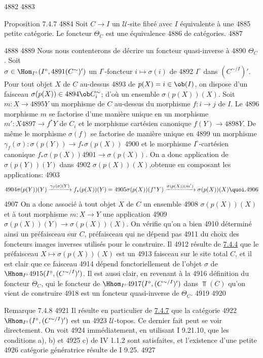   4882	
  4883	\begin{enonce*}{Proposition 7.4.7}
  4884	Soit $C \to I$ un $\mathcal{U}$-site fibré avec $I$ équivalente à une
  4885	petite catégorie. Le foncteur $\Theta_C$  est une équivalence
  4886	de catégories.
  4887	\end{enonce*}
  4888	
  4889	Nous nous contenterons de décrire un foncteur quasi-inverse à
  4890	$\Theta_C$. Soit \\ $\sigma \in \Hom_{I^{\circ}} (I^{\circ},
  4891	(C^{\sim})')$ \ie un $I^{\circ}$-foncteur $i \mapsto \sigma(i)$ de
  4892	$I^{\circ}$ dans $(C^{\sim/I})'$. Pour tout objet $X$ de $C$ au-dessus
  4893	de $p(X) = i \in \ob (I)$, on dispose d'un faisceau $\sigma(p(X)) \in
  4894	\ob C^{\sim}_i$; d'où un ensemble $\sigma (p(X)) (X)$. Soit $m : X \to
  4895	Y$ un morphisme de $C$ au-dessus du morphisme $f : i \to j$ de $I$. Le
  4896	morphisme $m$ se factorise d'une manière unique en un morphisme $m': X
  4897	\to f^{\ast} Y$ de $C_i$ et le morphisme cartésien canonique $f(Y) \to
  4898	Y$. De même le morphisme $\sigma(f)$ se factorise de manière unique en
  4899	un morphisme $\gamma_f(\sigma) : \sigma (p(Y)) \to f_{\ast} \sigma(p(X))$
  4900	et le morphisme $I^{\circ}$-cartésien canonique $f_{\ast} \sigma(p(X))
  4901	\to \sigma(p(X))$. On a donc application de $\sigma(p(Y))(Y)$ dans
  4902	$\sigma(p(X))(X)$,\pageoriginale obtenue en composant les applications:
  4903	$$
  4904	\sigma(p(Y))(Y) \xrightarrow{\gamma_f(\sigma)(Y)} f_{\ast} (p(X))(Y) =
  4905	\sigma(p(X))(f^{\ast}Y) \xrightarrow{\sigma(p(X))(m')} \sigma(p(X))(X){\quoi}.
  4906	$$
  4907	On a donc associé à tout objet $X$ de $C$ un ensemble
  4908	$\sigma(p(X))(X)$ et à tout morphisme $m : X \to Y$ une application
  4909	$\sigma(p(X))(Y) \to \sigma(p(X))(X)$. On vérifie qu'on a bien
  4910	déterminé ainsi un préfaisceau sur $C$, préfaisceau qui ne dépend pas
  4911	du choix des foncteurs images inverses utilisés pour le construire. Il
  4912	résulte de \hyperref[VI.prop7.4.4]{7.4.4} que le préfaisceau $X \mapsto \sigma(p(X))(X)$ est un
  4913	faisceau sur le site total $C$, et  il est clair que ce faisceau
  4914	dépend fonctoriellement de l'objet $\sigma$ de $\Hhom_{I^{\circ}}
  4915	(I^{\circ}, (C^{\sim/I})')$. Il est aussi clair, en revenant à la
  4916	définition du foncteur $\Theta_{C}$, qui le foncteur de $\Hhom_{I^{\circ}}
  4917	(I^{\circ}, (C^{\sim/I})')$ dans $\Top(C)$ qu'on vient de construire
  4918	est un foncteur quasi-inverse de $\Theta_C$.
  4919	
  4920	\begin{enonce*}[remark]{Remarque 7.4.8}
  4921	Il résulte en particulier de \hyperref[VI.prop7.4.7]{7.4.7} que la catégorie
  4922	$\Hhom_{I^{\circ}} (I^{\circ}, (C^{\sim/I})')$ est un
  4923	$𝒰$-topos. Ce dernier fait peut se voir directement. On voit
  4924	immédiatement, en utilisant I 9.21.10, que les conditions a), b) et
  4925	c) de IV 1.1.2 sont satisfaites, et l'existence d'une petite
  4926	catégorie génératrice résulte de I 9.25.
  4927	\end{enonce*}
